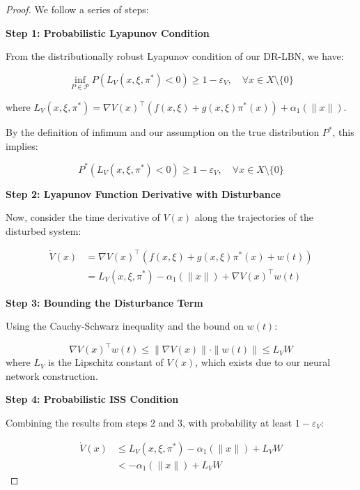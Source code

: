 \documentclass[11pt, oneside]{article}
\begin{document}
\begin{proof}
We follow a series of steps:

\textbf{Step 1: Probabilistic Lyapunov Condition}

From the distributionally robust Lyapunov condition of our DR-LBN, we have:

\begin{equation}
    \inf_{P\in\mathcal{P}} P(L_V(x,\xi,\pi^*) < 0) \geq 1 - \varepsilon_V, \quad \forall x \in X\setminus\{0\}
\end{equation}

where $L_V(x,\xi,\pi^*) = \nabla V(x)^\top(f(x,\xi) + g(x,\xi)\pi^*(x)) + \alpha_1(\|x\|)$.

By the definition of infimum and our assumption on the true distribution $P^*$, this implies:

\begin{equation}
    P^*(L_V(x,\xi,\pi^*) < 0) \geq 1 - \varepsilon_V, \quad \forall x \in X\setminus\{0\}
    \label{eq:prob_lyap}
\end{equation}

\textbf{Step 2: Lyapunov Function Derivative with Disturbance}

Now, consider the time derivative of $V(x)$ along the trajectories of the disturbed system:

\begin{align}
    \dot{V}(x) &= \nabla V(x)^\top \left(f(x,\xi) + g(x,\xi)\pi^*(x) + w(t)\right) \\
    &= L_V(x,\xi,\pi^*) - \alpha_1(\|x\|) + \nabla V(x)^\top w(t)
\end{align}

\textbf{Step 3: Bounding the Disturbance Term}

Using the Cauchy-Schwarz inequality and the bound on $w(t)$:

\begin{equation}
    \nabla V(x)^\top w(t) \leq \|\nabla V(x)\| \cdot \|w(t)\| \leq L_V W
\end{equation}
%
where $L_V$ is the Lipschitz constant of $V(x)$, which exists due to our neural network construction.

\textbf{Step 4: Probabilistic ISS Condition}

Combining the results from steps 2 and 3, with probability at least $1 - \varepsilon_V$:

\begin{align}
    \dot{V}(x) &\leq L_V(x,\xi,\pi^*) - \alpha_1(\|x\|) + L_V W \\
    &< -\alpha_1(\|x\|) + L_V W
\end{align}


\end{proof}
\end{document}
